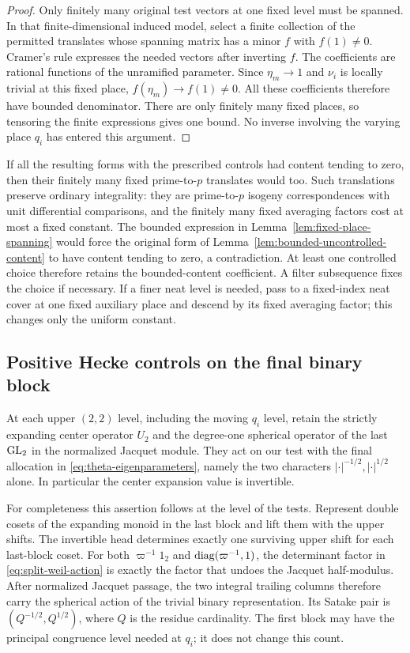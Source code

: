 \begin{proof}
 Only finitely many original test vectors at one fixed level must be
 spanned.  In that finite-dimensional induced model, select a finite
 collection of the permitted translates whose spanning matrix has a
 minor $f$ with $f(1)\ne0$.  Cramer's rule expresses the needed
 vectors after inverting $f$.  The coefficients are rational
 functions of the unramified parameter.  Since
 $\eta_m\to1$ and $\nu_i$ is locally trivial at this fixed place,
 $f(\eta_m)\to f(1)\ne0$.  All these coefficients therefore have
 bounded denominator.  There are only finitely many fixed places,
 so tensoring the finite expressions gives one bound.  No inverse
 involving the varying place $q_i$ has entered this argument.
\end{proof}

If all the resulting forms with the prescribed controls had content
tending to zero, then their finitely many fixed prime-to-$p$ translates
would too.  Such translations preserve ordinary integrality: they are
prime-to-$p$ isogeny correspondences with unit differential comparisons,
and the finitely many fixed averaging factors cost at most a fixed
constant.  The bounded expression in
Lemma~\ref{lem:fixed-place-spanning} would force the original form of
Lemma~\ref{lem:bounded-uncontrolled-content} to have content tending to
zero, a contradiction.  At least one controlled choice therefore retains
the bounded-content coefficient.  A filter subsequence fixes the choice
if necessary.  If a finer neat level is needed, pass to a fixed-index
neat cover at one fixed auxiliary place and descend by its fixed
averaging factor; this changes only the uniform constant.

\subsection{Positive Hecke controls on the final binary block}

At each upper $(2,2)$ level, including the moving $q_i$ level, retain the
strictly expanding center operator $U_2$ and the degree-one spherical
operator of the last $\operatorname{GL}_2$ in the normalized Jacquet module.  They act
on our test with the final allocation in
\eqref{eq:theta-eigenparameters}, namely the two characters
$|\cdot|^{-1/2},|\cdot|^{1/2}$ alone.  In particular the center
expansion value is invertible.

For completeness this assertion follows at the level of the tests.
Represent double cosets of the expanding monoid in the last block and
lift them with the upper shifts.  The invertible head determines exactly
one surviving upper shift for each last-block coset.  For both
$\varpi^{-1}1_2$ and $\operatorname{diag}(\varpi^{-1},1)$, the determinant factor in
\eqref{eq:split-weil-action} is exactly the factor that undoes the
Jacquet half-modulus.  After normalized Jacquet passage, the two
integral trailing columns therefore carry the spherical action of the
trivial binary representation.  Its Satake pair is
$(Q^{-1/2},Q^{1/2})$, where $Q$ is the residue cardinality.  The first
block may have the principal congruence level needed at $q_i$; it does
not change this count.

